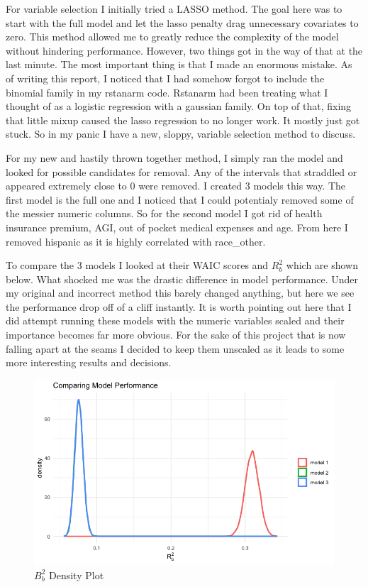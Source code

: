 For variable selection I initially tried a LASSO method. The goal here was to start with the full model and let the lasso penalty drag unnecessary covariates to zero. This method allowed me to greatly reduce the complexity of the model without hindering performance. However, two things got in the way of that at the last minute. The most important thing is that I made an enormous mistake. As of writing this report, I noticed that I had somehow forgot to include the binomial family in my rstanarm code. Rstanarm had been treating what I thought of as a logistic regression with a gaussian family. On top of that, fixing that little mixup caused the lasso regression to no longer work. It mostly just got stuck. So in my panic I have a new, sloppy, variable selection method to discuss. 

For my new and hastily thrown together method, I simply ran the model and looked for possible candidates for removal. Any of the intervals that straddled or appeared extremely close to 0 were removed. I created 3 models this way. The first model is the full one and I noticed that I could potentialy removed some of the messier numeric columns. So for the second model I got rid of health insurance premium, AGI, out of pocket medical expenses and age. From here I removed hispanic as it is highly correlated with race\_other. 

To compare the 3 models I looked at their WAIC scores and $R_b^2$ which are shown below. What shocked me was the drastic difference in model performance. Under my original and incorrect method this barely changed anything, but here we see the performance drop off of a cliff instantly. It is worth pointing out here that I did attempt running these models with the numeric variables scaled and their importance becomes far more obvious. For the sake of this project that is now falling apart at the seams I decided to keep them unscaled as it leads to some more interesting results and decisions. 



\begin{figure}[ht!]%
    \centering
    \includegraphics[width=0.8\columnwidth]{../presentation/images/rbsquared.png}
    \caption{$B_b^2$ Density Plot}%
    \label{fig:example}%
\end{figure}

